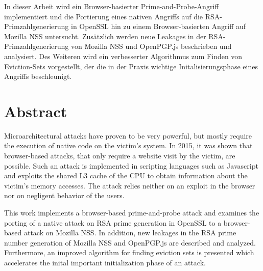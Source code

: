 In dieser Arbeit wird ein Browser-basierter Prime-and-Probe-Angriff implementiert und die Portierung eines nativen Angriffs auf die RSA-Primzahlgenerierung \cite{RSAKeyGeneration2} in OpenSSL hin zu einem Browser-basierten Angriff auf Mozilla NSS untersucht.
Zusätzlich werden neue Leakages in der RSA-Primzahlgenerierung von Mozilla NSS und OpenPGP.js beschrieben und analysiert.
Des Weiteren wird ein verbesserter Algorithmus zum Finden von Eviction-Sets vorgestellt, der die in der Praxis wichtige Initalisierungsphase eines Angriffs beschleunigt. 


{\let\cleardoublepage\relax \chapter*{Abstract}}

Microarchitectural attacks have proven to be very powerful, but mostly require the execution of native code on the victim's system. 
In 2015, it was shown that browser-based attacks, that only require a website visit by the victim, are possible.
Such an attack is implemented in scripting languages such as Javascript and exploits the shared L3 cache of the CPU to obtain information about the victim's memory accesses.
The attack relies neither on an exploit in the browser nor on negligent behavior of the users.

This work implements a browser-based prime-and-probe attack and examines the porting of a native attack on RSA prime generation in OpenSSL to a browser-based attack on Mozilla NSS.
In addition, new leakages in the RSA prime number generation of Mozilla NSS and OpenPGP.js are described and analyzed.
Furthermore, an improved algorithm for finding eviction sets is presented which accelerates the inital important initialization phase of an attack.